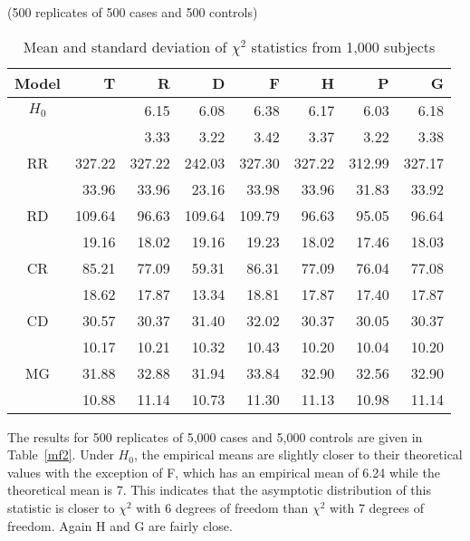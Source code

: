\begin{table}[h]\centering
\caption{Mean and standard deviation of $\chi^2$ statistics from
1,000 subjects\label{mf1}} (500 replicates of 500 cases and 500 controls)\\
\begin{tabular}{crrrrrrr}
\\
\hline
Model   &    T &      R &       D &        F &       H &       P &       G\\
\hline
$H_0$&         &   6.15 &    6.08 &     6.38 &    6.17 &    6.03 &    6.18\\%
     &         &   3.33 &    3.22 &     3.42 &    3.37 &    3.22 &    3.38\\%
RR   &  327.22 & 327.22 &  242.03 &   327.30 &  327.22 &  312.99 &  327.17\\
     &   33.96 &  33.96 &   23.16 &    33.98 &   33.96 &   31.83 &   33.92\\
RD   &  109.64 &  96.63 &  109.64 &   109.79 &   96.63 &   95.05 &   96.64\\
     &   19.16 &  18.02 &   19.16 &    19.23 &   18.02 &   17.46 &   18.03\\
CR   &   85.21 &  77.09 &   59.31 &    86.31 &   77.09 &   76.04 &   77.08\\
     &   18.62 &  17.87 &   13.34 &    18.81 &   17.87 &   17.40 &   17.87\\
CD   &   30.57 &  30.37 &   31.40 &    32.02 &   30.37 &   30.05 &   30.37\\
     &   10.17 &  10.21 &   10.32 &    10.43 &   10.20 &   10.04 &   10.20\\
MG   &   31.88 &  32.88 &   31.94 &    33.84 &   32.90 &   32.56 &   32.90\\
     &   10.88 &  11.14 &   10.73 &    11.30 &   11.13 &   10.98 &   11.14\\
\hline
\end{tabular}
\end{table}

The results for 500 replicates of 5,000 cases and 5,000 controls are given in
Table~\ref{mf2}.  Under $H_0$, the empirical means are slightly closer to their
theoretical values with the exception of F, which has an empirical mean of 6.24
while the theoretical mean is 7.  This indicates that the asymptotic
distribution of this statistic is closer to $\chi^2$ with 6 degrees of freedom
than $\chi^2$ with 7 degrees of freedom.  Again H and G are fairly close.

